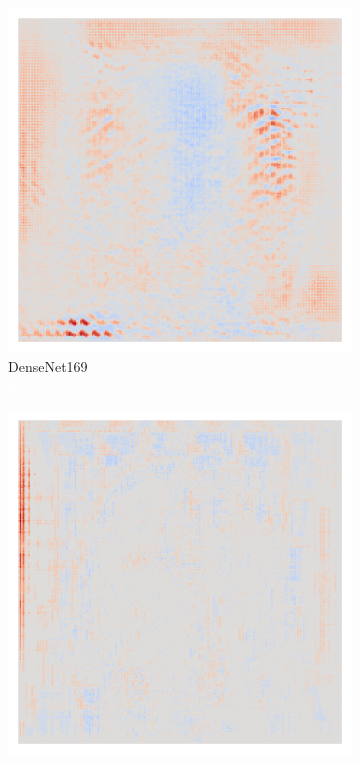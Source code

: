 \begin{figure}[H]
\begin{subfigure}{0.16\linewidth}
        \includegraphics[height=1\linewidth]{01-images/05-resultate/uap_densenet169/uap0-densenet169-mri_data-n200-robustificationslevel0.png}
        \caption{DenseNet169\\\textcolor{white}{Raichu}}
    \end{subfigure}\hfill%
    \begin{subfigure}{0.16\linewidth}
        \centering
        \includegraphics[height=1\linewidth]{01-images/05-resultate/uap_efficientnet_s/uap0-efficientnet_v2_s-mri_data-n200-robustificationslevel0.png}

\end{subfigure}
\end{figure}
